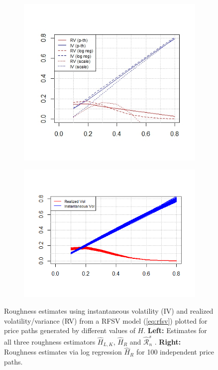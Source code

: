 \documentclass{article}
\begin{document}
\begin{figure}[htbp]
    \centering
    
    \begin{subfigure}{0.48\textwidth}
        \includegraphics[width=\linewidth]{rfsv_single.jpeg}
    \end{subfigure}
    \hfill
    \begin{subfigure}{0.48\textwidth}
        \includegraphics[width=\linewidth]{rfsv_multiple.png}
    \end{subfigure}
    
    \caption{Roughness estimates using instantaneous volatility (IV) and realized volatility/variance (RV) from a RFSV model (\ref{eq:rfsv}) plotted for price paths generated by different values of $H$. \textbf{Left:} Estimates for all three roughness estimators $\widehat{H}_{L,K}$, $\widehat{H}_R$ and $\widehat{\mathscr{R}}_n^s$ . \textbf{Right:} Roughness estimates via log regression $\widehat{H}_R$ for 100 independent price paths.}
    \label{fig:ex8plots}
\end{figure}\\\\
\end{document}

